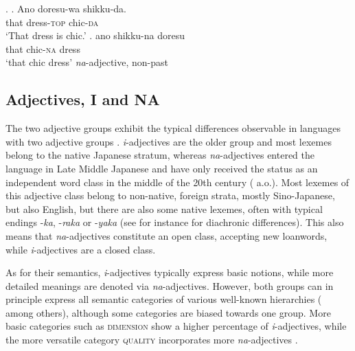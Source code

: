 \ex. \ag. Ano doresu-wa shikku-da.\\
that dress-\textsc{top} chic-\textsc{da}\\
`That dress is chic.'
\bg. ano shikku-na doresu\\
that chic-\textsc{na} dress\\
`that chic dress' \null \hfill \textit{na}-adjective, non-past

\subsection{Adjectives, I and NA} \label{chapter 1, i and na}

The two adjective groups exhibit the typical differences observable in languages with two adjective groups \citep{dixon:2004:adj}. \textit{i}-adjectives are the older group and most lexemes belong to the native Japanese stratum, whereas \textit{na}-adjectives entered the language in Late Middle Japanese and have only received the status as an independent word class in the middle of the 20th century (\citealt{kato:2003:nihongo, lewin:2003:abriss, frellesvig:2010:history} a.o.). Most lexemes of this adjective class belong to non-native, foreign strata, mostly Sino-Japanese, but also English, but there are also some native lexemes, often with typical endings -\textit{ka}, -\textit{raka} or -\textit{yaka} (see for instance \citealt[210–213]{uehara:1998:syntactic} for diachronic differences). This also means that \textit{na}-adjectives constitute an open class, accepting new loanwords, while \textit{i}-adjectives are a closed class.

As for their semantics, \textit{i}-adjectives typically express basic notions, while more detailed meanings are denoted via \textit{na}-adjectives. However, both groups can in principle express all semantic categories of various well-known hierarchies (\citealt{scott:2002:stacked} among others), although some categories are biased towards one group. More basic categories such as \textsc{dimension} show a higher percentage of \textit{i}-adjectives, while the more versatile category \textsc{quality} incorporates more \textit{na}-adjectives \citep{uehara:1998:syntactic}.

